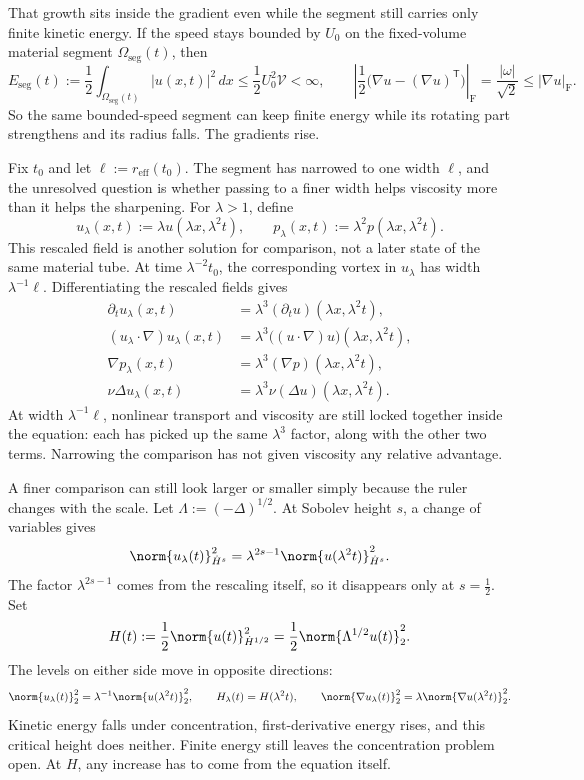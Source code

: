 That growth sits inside the gradient even while the segment still carries only finite kinetic energy. If the speed stays bounded by \(U_0\) on the fixed-volume material segment \(\Omega_{\mathrm{seg}}(t)\), then
\[
  E_{\mathrm{seg}}(t)
  :=
  \frac12\int_{\Omega_{\mathrm{seg}}(t)}|u(x,t)|^2\,dx
  \leq
  \frac12U_0^2\mathcal V
  <
  \infty,
  \qquad
  \left|\frac12\bigl(\nabla u-(\nabla u)^{\mathsf T}\bigr)\right|_{\mathrm F}
  =
  \frac{|\omega|}{\sqrt2}
  \leq
  |\nabla u|_{\mathrm F}.
\]
So the same bounded-speed segment can keep finite energy while its rotating part strengthens and its radius falls. The gradients rise.


Fix \(t_0\) and let \(\ell:=r_{\mathrm{eff}}(t_0)\). The segment has narrowed to one width \(\ell\), and the unresolved question is whether passing to a finer width helps viscosity more than it helps the sharpening. For \(\lambda>1\), define
\[
  u_\lambda(x,t)
  :=
  \lambda u(\lambda x,\lambda^2t),
  \qquad
  p_\lambda(x,t)
  :=
  \lambda^2p(\lambda x,\lambda^2t).
\]
This rescaled field is another solution for comparison, not a later state of the same material tube. At time \(\lambda^{-2}t_0\), the corresponding vortex in \(u_\lambda\) has width \(\lambda^{-1}\ell\). Differentiating the rescaled fields gives
\[
\begin{aligned}
  \partial_tu_\lambda(x,t)
  &=
  \lambda^3(\partial_tu)(\lambda x,\lambda^2t),
  \\
  (u_\lambda\cdot\nabla)u_\lambda(x,t)
  &=
  \lambda^3\bigl((u\cdot\nabla)u\bigr)(\lambda x,\lambda^2t),
  \\
  \nabla p_\lambda(x,t)
  &=
  \lambda^3(\nabla p)(\lambda x,\lambda^2t),
  \\
  \nu\Delta u_\lambda(x,t)
  &=
  \lambda^3\nu(\Delta u)(\lambda x,\lambda^2t).
\end{aligned}
\]
At width \(\lambda^{-1}\ell\), nonlinear transport and viscosity are still locked together inside the equation: each has picked up the same \(\lambda^3\) factor, along with the other two terms. Narrowing the comparison has not given viscosity any relative advantage.


A finer comparison can still look larger or smaller simply because the ruler changes with the scale. Let \(\Lambda:=(-\Delta)^{1/2}\). At Sobolev height \(s\), a change of variables gives
\[
  \norm{u_\lambda(t)}_{\dot H^s}^2
  =
  \lambda^{2s-1}
  \norm{u(\lambda^2t)}_{\dot H^s}^2.
\]
The factor \(\lambda^{2s-1}\) comes from the rescaling itself, so it disappears only at \(s=\tfrac12\). Set
\[
  H(t)
  :=
  \frac12\norm{u(t)}_{\dot H^{1/2}}^2
  =
  \frac12\norm{\Lambda^{1/2}u(t)}_2^2.
\]
The levels on either side move in opposite directions:
\[
  \norm{u_\lambda(t)}_2^2
  =
  \lambda^{-1}\norm{u(\lambda^2t)}_2^2,
  \qquad
  H_\lambda(t)=H(\lambda^2t),
  \qquad
  \norm{\nabla u_\lambda(t)}_2^2
  =
  \lambda\norm{\nabla u(\lambda^2t)}_2^2.
\]
Kinetic energy falls under concentration, first-derivative energy rises, and this critical height does neither. Finite energy still leaves the concentration problem open. At \(H\), any increase has to come from the equation itself.

